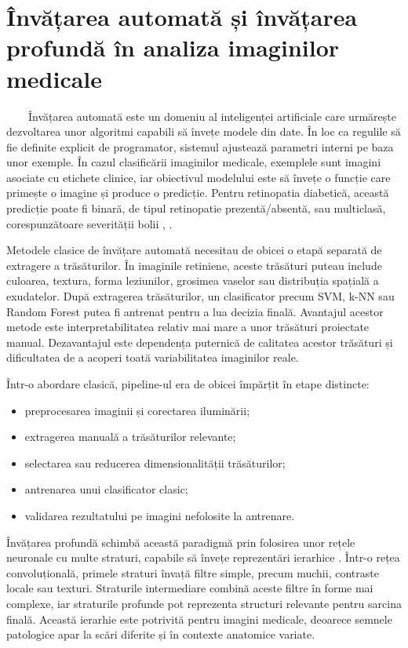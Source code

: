 \documentclass[12pt, a4paper, oneside, romanian]{teza-upb}
\begin{document}
\section{Învățarea automată și învățarea profundă în analiza imaginilor medicale}

\ \ \ \ Învățarea automată este un domeniu al inteligenței artificiale care urmărește dezvoltarea unor algoritmi capabili să învețe modele din date. În loc ca regulile să fie definite explicit de programator, sistemul ajustează parametri interni pe baza unor exemple. În cazul clasificării imaginilor medicale, exemplele sunt imagini asociate cu etichete clinice, iar obiectivul modelului este să învețe o funcție care primește o imagine și produce o predicție. Pentru retinopatia diabetică, această predicție poate fi binară, de tipul retinopatie prezentă/absentă, sau multiclasă, corespunzătoare severității bolii \cite{3_gulshan2016development}, \cite{15_li2019diagnostic}.
\bigskip

Metodele clasice de învățare automată necesitau de obicei o etapă separată de extragere a trăsăturilor. În imaginile retiniene, aceste trăsături puteau include culoarea, textura, forma leziunilor, grosimea vaselor sau distribuția spațială a exudatelor. După extragerea trăsăturilor, un clasificator precum SVM, k-NN sau Random Forest putea fi antrenat pentru a lua decizia finală. Avantajul acestor metode este interpretabilitatea relativ mai mare a unor trăsături proiectate manual. Dezavantajul este dependența puternică de calitatea acestor trăsături și dificultatea de a acoperi toată variabilitatea imaginilor reale.
\bigskip

Într-o abordare clasică, pipeline-ul era de obicei împărțit în etape distincte:

\begin{itemize}
  \item preprocesarea imaginii și corectarea iluminării;
  \item extragerea manuală a trăsăturilor relevante;
  \item selectarea sau reducerea dimensionalității trăsăturilor;
  \item antrenarea unui clasificator clasic;
  \item validarea rezultatului pe imagini nefolosite la antrenare.
\end{itemize}

\bigskip

Învățarea profundă schimbă această paradigmă prin folosirea unor rețele neuronale cu multe straturi, capabile să învețe reprezentări ierarhice \cite{19_lecun2015deep}. Într-o rețea convoluțională, primele straturi învață filtre simple, precum muchii, contraste locale sau texturi. Straturile intermediare combină aceste filtre în forme mai complexe, iar straturile profunde pot reprezenta structuri relevante pentru sarcina finală. Această ierarhie este potrivită pentru imagini medicale, deoarece semnele patologice apar la scări diferite și în contexte anatomice variate.
\bigskip
\end{document}
